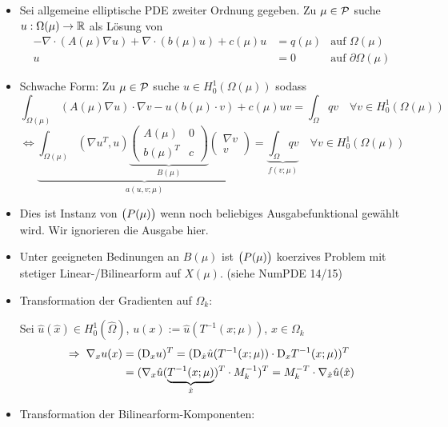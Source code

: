 \begin{itemize}
	\item Sei allgemeine elliptische PDE zweiter Ordnung gegeben.
		Zu $\mu \in \mathcal{P}$ suche $u : \Omega(\mu) \to \mathbb{R}$ als Lösung von
		\begin{align*}
			-\nabla \cdot (A(\mu) \nabla u) + \nabla \cdot ( b(\mu) u ) + c(\mu) u &= q(\mu) &\text{auf } \Omega(\mu)\\
			u &= 0 &\text{auf } \partial\Omega(\mu)
		\end{align*}
	\item Schwache Form: Zu $\mu \in \mathcal{P}$ suche $u \in H_0^1(\Omega(\mu))$ sodass
		\[
			\int_{\Omega(\mu)}(A(\mu)\nabla u) \cdot \nabla v - u( b(\mu) \cdot v) + c(\mu) u v = \int_\Omega q v \quad \forall v \in H_0^1(\Omega(\mu))
		\]
		\[
			\Leftrightarrow \underbrace{\int_{\Omega(\mu)} (\nabla u^T, u) \underbrace{\begin{pmatrix} A(\mu) & 0 \\ b(\mu)^T & c \end{pmatrix}}_{B(\mu)} \begin{pmatrix}\nabla v \\ v\end{pmatrix}}_{a(u,v;\mu)} = \underbrace{\int_\Omega q v}_{f(v;\mu)} \quad \forall v \in H_0^1(\Omega(\mu))
		\]
	\item Dies ist Instanz von $\big(P(\mu)\big)$ wenn noch beliebiges Ausgabefunktional gewählt wird.
		Wir ignorieren die Ausgabe hier.
	\item Unter geeigneten Bedinungen an $B(\mu)$ ist $\big(P(\mu)\big)$ koerzives Problem mit stetiger Linear-/Bilinearform auf $X(\mu)$. (siehe NumPDE 14/15)
	\item Transformation der Gradienten auf $\Omega_k$:

		Sei $\hat u(\hat x) \in H_0^1(\hat \Omega)$, $u(x) := \hat u(T^{-1}(x;\mu))$, $x \in \Omega_k$
		\begin{align*}
			\Rightarrow \; \nabla_x u(x) &= (\mathrm{D}_x u)^T = (\mathrm{D}_{\hat x} \hat u(T^{-1}(x;\mu)) \cdot \mathrm{D}_x T^{-1}(x;\mu))^T \\
			&= (\nabla_x \hat u(\underbrace{T^{-1}(x;\mu)}_{\hat x})^T \cdot M_k^{-1})^T = M_k^{-T} \cdot \nabla_{\hat x} \hat u(\hat x)
		\end{align*}
	\item Transformation der Bilinearform-Komponenten:


\end{itemize}
